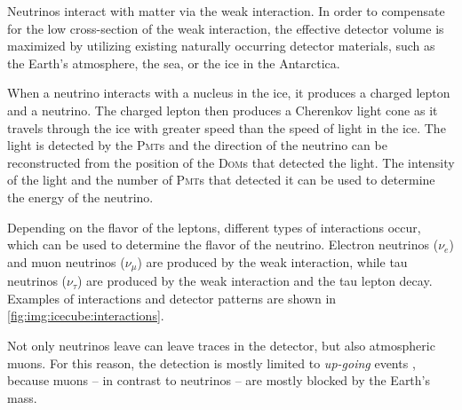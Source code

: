 Neutrinos interact with matter via the weak interaction.
In order to compensate for the low cross-section of the weak interaction,
  the effective detector volume is maximized by utilizing existing naturally occurring detector materials,
  such as
    the Earth's atmosphere,
    the sea,
    or the ice in the Antarctica.

When a neutrino interacts with a nucleus in the ice,
it produces a charged lepton and a neutrino.
The charged lepton then produces a Cherenkov light cone
  as it travels through the ice
    with greater speed than the speed of light in the ice.
The light is detected by the \textsc{Pmt}s
  and the direction of the neutrino can be reconstructed
    from the position of the \textsc{Dom}s
      that detected the light.
The intensity of the light and the number of \textsc{Pmt}s that detected it
  can be used to determine the energy of the neutrino.



Depending on the flavor of the leptons,
  different types of interactions occur,
  which can be used to determine the flavor of the neutrino.
Electron neutrinos ($\nu_e$) and muon neutrinos ($\nu_\mu$) are produced by the weak interaction,
  while tau neutrinos ($\nu_\tau$) are produced by the weak interaction
  and the tau lepton decay.
Examples of interactions and detector patterns are shown in \autoref{fig:img:icecube:interactions}.

 \label{sec:neutrino_astronomy:icecube:up_going}
Not only neutrinos leave can leave traces in the detector, %
  but also atmospheric muons.
For this reason,
  the detection is mostly limited to \emph{up-going} events \cite{icecube_aartsen},
    because muons
      – in contrast to neutrinos –
    are mostly blocked by the Earth's mass.




